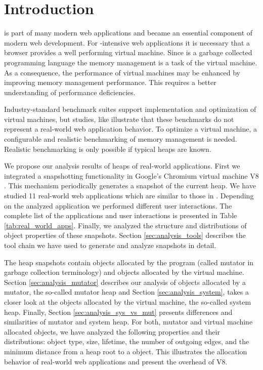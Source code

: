 
\section{Introduction}

\JS is part of many modern web applications and became an essential component
of modern web development. For \JS-intensive web applications it is
necessary that a browser provides a well performing \JS virtual machine. Since
\JS is a garbage collected programming language the memory management is a task
of the virtual machine. As a consequence, the performance of \JS virtual
machines may be enhanced by improving memory management performance. This
requires a better understanding of performance deficiencies.

Industry-standard benchmark suites support implementation and optimization of
\JS virtual machines, but studies, like \cite{JSMeter2009} illustrate that
these benchmarks do not represent a real-world web application behavior. To
optimize a \JS virtual machine, a configurable and realistic benchmarking of
memory management is needed. Realistic benchmarking is only possible if typical
\JS heaps are known.

We propose our analysis results of \JS heaps of real-world applications. First
we integrated a snapshotting functionality in Google's Chromium \cite{Chromium}
virtual machine V8 \cite{V8}. This mechanism periodically generates a snapshot
of the current \JS heap. We have studied 11 real-world web applications which
are similar to those in \cite{JSMeter2009}. Depending on the analyzed
application we performed different user interactions. The complete list of the
applications and user interactions is presented in Table
\ref{tab:real_world_apps}. Finally, we analyzed the structure and distributions
of object properties of these snapshots. Section \ref{sec:analysis_tools}
describes the tool chain we have used to generate and analyze snapshots in
detail.

The heap snapshots contain objects allocated by the \JS program (called mutator
in garbage collection terminology) and objects allocated by the virtual
machine. Section \ref{sec:analysis_mutator} describes our analysis of objects
allocated by a mutator, the so-called mutator heap and Section
\ref{sec:analysis_system}, takes a closer look at the objects allocated by the
virtual machine, the so-called system heap. Finally, Section
\ref{sec:analysis_sys_vs_mut} presents differences and similarities of mutator
and system heap. For both, mutator and virtual machine allocated objects, we
have analyzed the following properties and their distributions: object type,
size, lifetime, the number of outgoing edges, and the minimum distance from a
heap root to a object. This illustrates the allocation behavior of real-world
web applications and present the overhead of V8.

